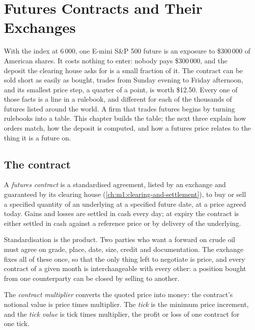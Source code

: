 \chapter{Futures Contracts and Their Exchanges}\label{ch:m1:futures-contracts-and-exchanges}

With the index at 6\,000, one E-mini S\&P 500 future is an exposure to
\$300\,000 of American shares. It costs nothing to enter: nobody pays
\$300\,000, and the deposit the clearing house asks for is a small fraction of
it. The contract can be sold short as easily as bought, trades from Sunday
evening to Friday afternoon, and its smallest price step, a quarter of a
point, is worth \$12.50. Every one of those facts is a line in a rulebook,
and different for each of the thousands of futures listed around the world.
A firm that trades futures begins by turning rulebooks into a table. This
chapter builds the table; the next three explain how orders match, how the
deposit is computed, and how a futures price relates to the thing it is a
future on.

\section{The contract}

\begin{definition}\label{def:m1:futures-contracts-and-exchanges:future}
A \emph{futures contract} is a standardised
agreement, listed by an exchange and guaranteed by its clearing house
(\cref{ch:m1:clearing-and-settlement}), to buy or sell a specified quantity of
an underlying at a specified future date, at a price agreed today. Gains and
losses are settled in cash every day; at expiry the contract is either
settled in cash against a reference price or by delivery of the underlying.
\end{definition}

Standardisation is the product. Two parties who want a forward on crude oil
must agree on grade, place, date, size, credit and documentation. The
exchange fixes all of these once, so that the only thing left to negotiate is
price, and every contract of a given month is interchangeable with every
other: a position bought from one counterparty can be closed by selling to
another.

\begin{definition}\label{def:m1:futures-contracts-and-exchanges:tick}
The \emph{contract multiplier} converts the quoted
price into money: the contract's notional value is price times multiplier.
The \emph{tick} is the minimum price increment, and the \emph{tick
value} is tick times multiplier, the profit or loss of one
contract for one tick.
\end{definition}

